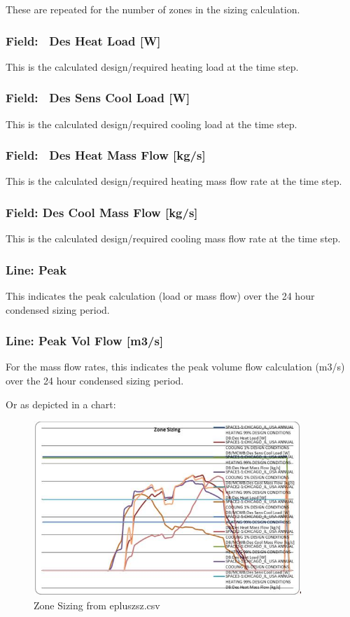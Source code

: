 These are repeated for the number of zones in the sizing calculation.

\subsubsection{Field:~ Des Heat Load {[}W{]}}\label{field-des-heat-load-w}

This is the calculated design/required heating load at the time step.

\subsubsection{Field:~ Des Sens Cool Load {[}W{]}}\label{field-des-sens-cool-load-w}

This is the calculated design/required cooling load at the time step.

\subsubsection{Field:~ Des Heat Mass Flow {[}kg/s{]}}\label{field-des-heat-mass-flow-kgs-000}

This is the calculated design/required heating mass flow rate at the time step.

\subsubsection{Field: Des Cool Mass Flow {[}kg/s{]}}\label{field-des-cool-mass-flow-kgs-000}

This is the calculated design/required cooling mass flow rate at the time step.

\subsubsection{Line: Peak}\label{line-peak}

This indicates the peak calculation (load or mass flow) over the 24 hour condensed sizing period.

\subsubsection{Line: Peak Vol Flow {[}m3/s{]}}\label{line-peak-vol-flow-m3s}

For the mass flow rates, this indicates the peak volume flow calculation (m3/s) over the 24 hour condensed sizing period.

Or as depicted in a chart:

\begin{figure}[hbtp] %
\centering
\includegraphics[width=0.9\textwidth, height=0.9\textheight, keepaspectratio=true]{media/image018.jpg}
\caption{Zone Sizing from epluszsz.csv \protect \label{fig:zone-sizing-from-epluszsz.csv}}
\end{figure}
